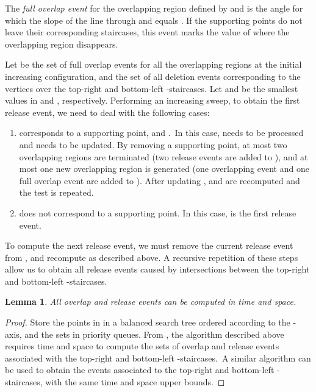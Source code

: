 \documentclass[11pt,letterpaper,english]{article}
\newtheorem{lemma}{Lemma}
\theoremstyle{definition}
\begin{document}
The \emph{full overlap event} for the overlapping region defined by
 and  is the angle  for which the slope of the
line through  and  equals . If
the supporting points do not leave their corresponding staircases,
this event marks the value of  where the overlapping region
disappears.

Let  be the set of full overlap events for all the
overlapping regions at the initial increasing configuration, and
 the set of all deletion events corresponding to the
vertices over the top-right and bottom-left -staircases. Let
 and  be the smallest values in  and
, respectively. Performing an increasing sweep, to obtain
the first release event, we need to deal with the following cases:
\begin{enumerate}
\item \label{bhull:step_1}  corresponds to a supporting
  point, and .\, In this case,
   needs to be processed and  needs to be
  updated. By removing a supporting point, at most two overlapping
  regions are terminated (two release events are added to
  ), and at most one new overlapping region is generated
  (one overlapping event and one full overlap event are added to
  ). After updating ,  and
   are recomputed and the test is repeated.
\item  does not correspond to a supporting point. In this
  case,  is the first release event.
\end{enumerate}

To compute the next release event, we must remove the current release
event from , and recompute  as described above. A
recursive repetition of these steps allow us to obtain all release
events caused by intersections between the top-right and bottom-left
-staircases.

\begin{lemma}\label{bhull:lemma:overlap_events}
  All overlap and release events can be computed in  time
  and  space.
\end{lemma}
\begin{proof}
  Store the points in  in a balanced search tree ordered according
  to the -axis, and the sets  in priority
  queues. From , the algorithm
  described above requires  time and  space to
  compute the sets of overlap and release events associated with the
  top-right and bottom-left -staircases.~A similar algorithm
  can be used to obtain the events associated to the top-right and
  bottom-left -staircases, with the same time and
  space upper bounds.
\end{proof}
\end{document}
